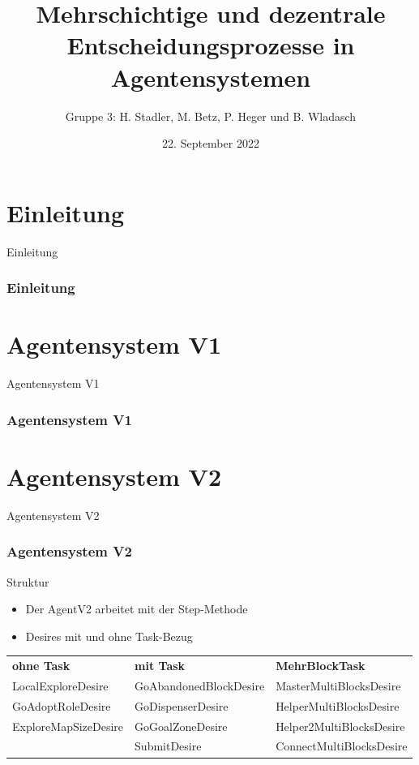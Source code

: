 \documentclass[aspectratio=169]{beamer} %
\title{Mehrschichtige und dezentrale
Entscheidungsprozesse in Agentensystemen}
\author[H. Stadler, M. Betz]{Gruppe 3: H. Stadler, M. Betz, P. Heger und B. Wladasch}
\institute{Artificial Intelligence Group,\\
University of Hagen, Germany}
\date{22. September 2022}
\begin{document}

\begin{frame}
  \titlepage
\end{frame}
\nologo

\section{Einleitung}
\begin{frame}{Einleitung}
\frametitle{Einleitung}
\end{frame}

\section{Agentensystem V1}
\begin{frame}{Agentensystem V1}
\frametitle{Agentensystem V1}
\end{frame}

\section{Agentensystem V2}
\begin{frame}{Agentensystem V2}
	\frametitle{Agentensystem V2}
	\begin{block}{Struktur}
	\end{block}
	\textbf{ }
	\begin{itemize}
		\setlength\itemsep{5mm}
		\item Der AgentV2 arbeitet mit der Step-Methode		
		\item Desires mit und ohne Task-Bezug
	\end{itemize}
	\begin{table}
	\small
	\begin{tabular}{lll}
		\textbf{ohne Task} & \textbf{mit Task} & \textbf{Mehr\-Block\-Task}\\
		LocalExploreDesire & GoAbandonedBlockDesire & MasterMultiBlocksDesire\\
		GoAdoptRoleDesire & GoDispenserDesire & HelperMultiBlocksDesire\\
		ExploreMapSizeDesire & GoGoalZoneDesire & Helper2MultiBlocksDesire\\
		& SubmitDesire & ConnectMultiBlocksDesire\\
	\end{tabular}
	\end{table}
\end{frame}
\end{document}
